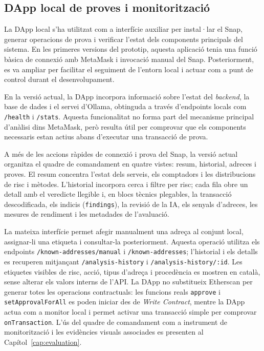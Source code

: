 \subsection{DApp local de proves i monitorització}

La DApp local s’ha utilitzat com a interfície auxiliar per instal·lar el Snap, generar operacions de prova i verificar l’estat dels components principals del sistema. En les primeres versions del prototip, aquesta aplicació tenia una funció bàsica de connexió amb MetaMask i invocació manual del Snap. Posteriorment, es va ampliar per facilitar el seguiment de l’entorn local i actuar com a punt de control durant el desenvolupament.

En la versió actual, la DApp incorpora informació sobre l’estat del \textit{backend}, la base de dades i el servei d’Ollama, obtinguda a través d’endpoints locals com \texttt{/health} i \texttt{/stats}. Aquesta funcionalitat no forma part del mecanisme principal d’anàlisi dins MetaMask, però resulta útil per comprovar que els components necessaris estan actius abans d’executar una transacció de prova.

A més de les accions ràpides de connexió i prova del Snap, la versió actual organitza el quadre de comandament en quatre vistes: resum, historial, adreces i proves. El resum concentra l’estat dels serveis, els comptadors i les distribucions de risc i mètodes. L’historial incorpora cerca i filtre per risc; cada fila obre un detall amb el veredicte llegible i, en blocs tècnics plegables, la transacció descodificada, els indicis (\texttt{findings}), la revisió de la IA, els senyals d’adreces, les mesures de rendiment i les metadades de l’avaluació.

La mateixa interfície permet afegir manualment una adreça al conjunt local, assignar-li una etiqueta i consultar-la posteriorment. Aquesta operació utilitza els endpoints \texttt{/known-addresses/manual} i \texttt{/known-addresses}; l'historial i els detalls es recuperen mitjançant \texttt{/analysis-history} i \texttt{/analysis-history/:id}. Les etiquetes visibles de risc, acció, tipus d’adreça i procedència es mostren en català, sense alterar els valors interns de l’API. La DApp no substitueix Etherscan per generar totes les operacions contractuals: les funcions reals \texttt{approve} i \texttt{setApprovalForAll} es poden iniciar des de \textit{Write Contract}, mentre la DApp actua com a monitor local i permet activar una transacció simple per comprovar \texttt{onTransaction}. L'ús del quadre de comandament com a instrument de monitorització i les evidències visuals associades es presenten al Capítol~\ref{cap:evaluation}.
